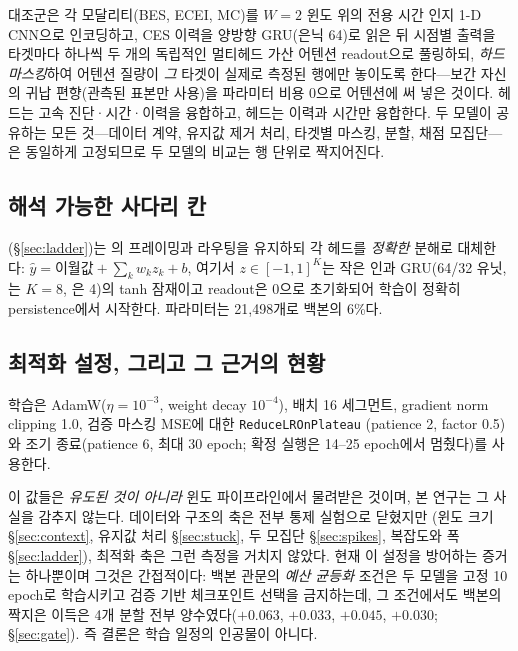 \documentclass[10pt,a4paper]{article}
\begin{document}
대조군은 각 모달리티(BES, ECEI, MC)를 $W{=}2$ 윈도 위의 전용 시간 인지 1-D
CNN으로 인코딩하고, CES 이력을 양방향 GRU(은닉 64)로 읽은 뒤 시점별 출력을
타겟마다 하나씩 두 개의 독립적인 멀티헤드 가산 어텐션 readout으로 풀링하되,
\emph{하드 마스킹}하여 어텐션 질량이 \emph{그} 타겟이 실제로 측정된 행에만
놓이도록 한다---보간 자신의 귀납 편향(관측된 표본만 사용)을 파라미터 비용 0으로
어텐션에 써 넣은 것이다. \Ti{} 헤드는 고속 진단·시간·이력을 융합하고, \Vrot{}
헤드는 이력과 시간만 융합한다. 두 모델이 공유하는 모든 것---데이터 계약, 유지값
제거 처리, 타겟별 마스킹, 분할, 채점 모집단---은 동일하게 고정되므로 두 모델의
비교는 행 단위로 짝지어진다.

\subsection{해석 가능한 사다리 칸}
\label{sec:model:rung}

\bthree{}(\S\ref{sec:ladder})는 \seqv{}의 프레이밍과 라우팅을 유지하되 각 헤드를
\emph{정확한} 분해로 대체한다: $\hat y = \text{이월값} +
\sum_k w_k z_k + b$, 여기서 $z\in[-1,1]^K$는 작은 인과 GRU(64/32 유닛, \Ti{}는
$K{=}8$, \Vrot{}은 4)의 tanh 잠재이고 readout은 0으로 초기화되어 학습이 정확히
persistence에서 시작한다. 파라미터는 21{,}498개로 백본의 6\%다.

\subsection{최적화 설정, 그리고 그 근거의 현황}
\label{sec:model:optim}

학습은 AdamW($\eta=10^{-3}$, weight decay $10^{-4}$), 배치 16 세그먼트,
gradient norm clipping 1.0, 검증 마스킹 MSE에 대한 \texttt{ReduceLROnPlateau}
(patience 2, factor 0.5)와 조기 종료(patience 6, 최대 30 epoch; 확정 실행은
14--25 epoch에서 멈췄다)를 사용한다.

이 값들은 \emph{유도된 것이 아니라} 윈도 파이프라인에서 물려받은 것이며, 본
연구는 그 사실을 감추지 않는다. 데이터와 구조의 축은 전부 통제 실험으로 닫혔지만
(윈도 크기 \S\ref{sec:context}, 유지값 처리 \S\ref{sec:stuck}, 두 모집단
\S\ref{sec:spikes}, 복잡도와 폭 \S\ref{sec:ladder}), 최적화 축은 그런 측정을
거치지 않았다. 현재 이 설정을 방어하는 증거는 하나뿐이며 그것은 간접적이다:
백본 관문의 \emph{예산 균등화} 조건은 두 모델을 고정 10 epoch로 학습시키고 검증
기반 체크포인트 선택을 금지하는데, 그 조건에서도 백본의 짝지은 \Ti{} 이득은
4개 분할 전부 양수였다($+0.063$, $+0.033$, $+0.045$, $+0.030$;
\S\ref{sec:gate}). 즉 결론은 학습 일정의 인공물이 아니다.
\end{document}
